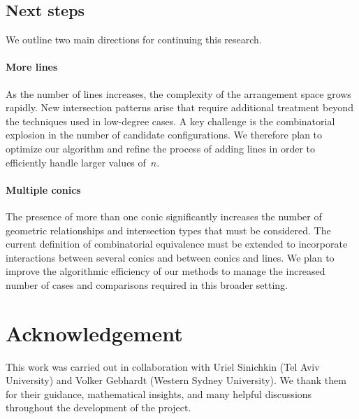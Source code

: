 \documentclass{svproc}
\begin{document}
\subsection{Next steps}

We outline two main directions for continuing this research.
\paragraph{More lines}
As the number of lines increases, the complexity of the arrangement space grows rapidly. New intersection patterns arise that require additional treatment beyond the techniques used in low-degree cases. A key challenge is the combinatorial explosion in the number of candidate configurations. We therefore plan to optimize our algorithm and refine the process of adding lines in order to efficiently handle larger values of~$n$.

\paragraph{Multiple conics}
The presence of more than one conic significantly increases the number of geometric relationships and intersection types that must be considered. The current definition of combinatorial equivalence must be extended to incorporate interactions between several conics and between conics and lines. We plan to improve the algorithmic efficiency of our methods to manage the increased number of cases and comparisons required in this broader setting.



\section*{Acknowledgement}
This work was carried out in collaboration with Uriel Sinichkin (Tel Aviv University) and Volker Gebhardt (Western Sydney University). 
We thank them for their guidance, mathematical insights, and many helpful discussions throughout the development of the project.

%


%
%


\end{document}
